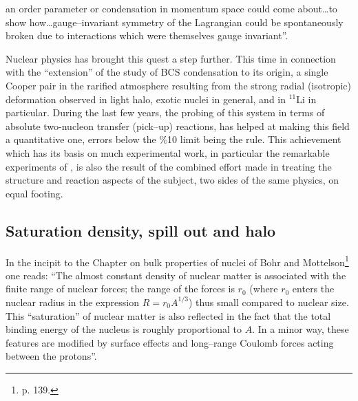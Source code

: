 an order parameter or condensation in momentum space could come about\dots to show how\dots gauge--invariant symmetry of the Lagrangian could be spontaneously broken due to interactions which were themselves gauge invariant''.


Nuclear physics has brought this quest a step further. This time in connection with the ``extension'' of the study of BCS condensation to its origin, a single Cooper pair in the rarified atmosphere resulting from the strong radial (isotropic) deformation observed in light halo, exotic nuclei in general, and in $^{11}$Li in particular. During the last few years, the probing of this system in terms of absolute two-nucleon transfer (pick--up) reactions, has helped at making this field a quantitative one, errors below the \%10 limit being the rule. This achievement which has its basis on much experimental work, in particular the remarkable experiments of \cite{Tanihata:08}, is also the result of the combined effort made in treating the structure and reaction aspects of the subject, two sides of the same physics, on equal footing. 
\subsection{Saturation density, spill out and halo}
In the incipit to the Chapter on bulk properties of nuclei of Bohr and Mottelson\footnote{ \cite{Bohr:69} p. 139.} one reads: ``The almost constant density of nuclear matter is associated with the finite range of nuclear forces; the range of the forces is $r_0$ (where $r_0$ enters the nuclear radius in the expression $R=r_0A^{1/3}$) thus small compared to nuclear size. This ``saturation'' of nuclear matter is also reflected in the fact that the total binding energy of the nucleus is roughly proportional to $A$. In a minor way, these features are modified by surface effects and long--range Coulomb forces acting between the protons''.




